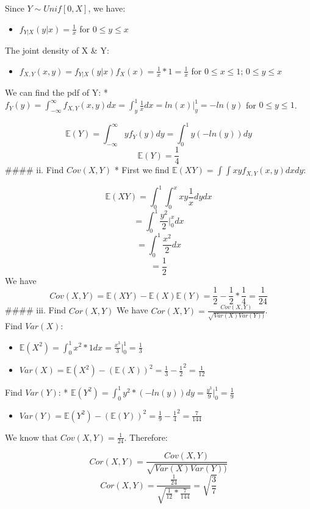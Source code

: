 \documentclass[]{article}
\providecommand{\tightlist}{%
  \setlength{\itemsep}{0pt}\setlength{\parskip}{0pt}}
\begin{document}
Since \(Y \sim Unif[0, X]\), we have:

\begin{itemize}
\tightlist
\item
  \(f_{Y|X} (y|x) = \frac{1}{x}\) for \(0 \leq y \leq x\)
\end{itemize}

The joint density of X \& Y:

\begin{itemize}
\tightlist
\item
  \(f_{X,Y}(x,y) = f_{Y|X} (y|x) f_X(x) = \frac{1}{x} * 1 = \frac{1}{x}\)
  for \(0 \leq x \leq 1\); \(0 \leq y \leq x\)
\end{itemize}

We can find the pdf of Y: *
\(f_Y(y) = \int_{-\infty }^{\infty} f_{X,Y}(x,y) dx = \int_y^1 \frac{1}{x}dx = ln(x) |_y^1 = -ln(y)\)
for \(0 \leq y \leq 1\).

\[\mathbb{E}(Y) = \int_{-\infty }^{\infty} y f_Y(y)dy = \int_0^1 y(-ln(y)) dy\]
\[\mathbb{E}(Y) =  \frac14\] \#\#\#\# ii. Find \(Cov(X,Y)\) * First we
find \(\mathbb{E}(XY) = \int \int xyf_{X,Y}(x,y)dxdy\):

\[\mathbb{E}(XY) = \int_0^1 \int_0^x xy \frac{1}{x} dy dx\]
\[= \int_0^1 \frac{y^2}{2}|_0^xdx\] \[= \int_0^1 \frac{x^2}{2}dx\]
\[ = \frac12\] We have
\[Cov(X,Y) = \mathbb{E}(XY) - \mathbb{E}(X)\mathbb{E}(Y) = \frac12 - \frac12*\frac14 = \frac{1}{24}\]
\#\#\#\# iii. Find \(Cor(X, Y)\) We have
\(Cor(X,Y) = \frac{Cov(X,Y)}{\sqrt{Var(X)Var(Y))}}\).\\
Find \(Var(X)\):

\begin{itemize}
\item
  \(\mathbb{E}(X^2) = \int_0^1 x^2 * 1 dx = \frac{x^3}{3}|_0^1 = \frac13\)
\item
  \(Var(X) = \mathbb{E}(X^2) - (\mathbb{E}(X))^2 = \frac13 - \frac12^2 = \frac1{12}\)
\end{itemize}

Find \(Var(Y)\): *
\(\mathbb{E}(Y^2) = \int_0^1 y^2 * (-ln(y))dy = \frac{y^3}{9} |_0^1 = \frac19\)

\begin{itemize}
\tightlist
\item
  \(Var(Y) = \mathbb{E}(Y^2) - (\mathbb{E}(Y))^2 = \frac19 - \frac14^2 = \frac7{144}\)
\end{itemize}

We know that \(Cov(X,Y) = \frac1{24}\). Therefore:

\[Cor(X,Y) = \frac{Cov(X,Y)}{\sqrt{Var(X)Var(Y))}}\]
\[Cor(X,Y) = \frac{\frac1{24}}{\sqrt{\frac{1}{12} * \frac{7}{144}}} = \sqrt{\frac37}\]
\end{document}
